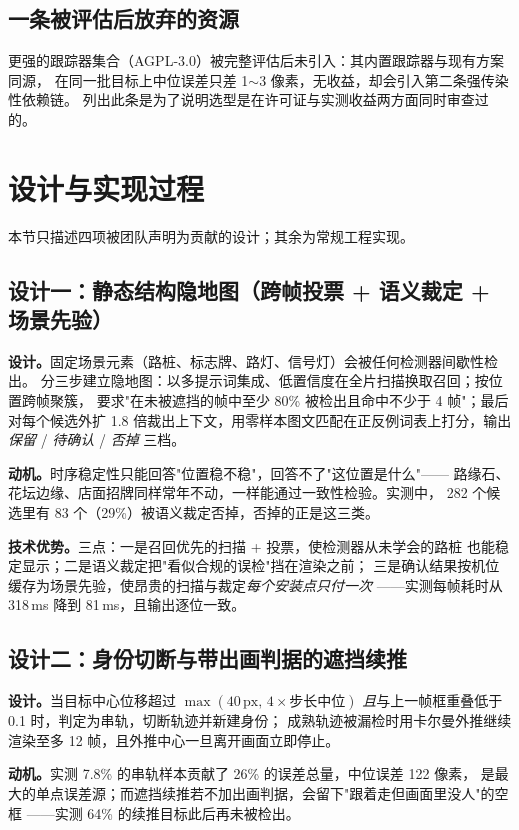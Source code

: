 \documentclass[11pt,a4paper]{ctexart}
\begin{document}
\subsection{一条被评估后放弃的资源}

更强的跟踪器集合（AGPL-3.0）被完整评估后未引入：其内置跟踪器与现有方案同源，
在同一批目标上中位误差只差 1$\sim$3 像素，无收益，却会引入第二条强传染性依赖链。
列出此条是为了说明选型是在许可证与实测收益两方面同时审查过的。

\section{设计与实现过程}

本节只描述四项被团队声明为贡献的设计；其余为常规工程实现。

\subsection{设计一：静态结构隐地图（跨帧投票 + 语义裁定 + 场景先验）}

\textbf{设计。}固定场景元素（路桩、标志牌、路灯、信号灯）会被任何检测器间歇性检出。
分三步建立隐地图：以多提示词集成、低置信度在全片扫描换取召回；按位置跨帧聚簇，
要求"在未被遮挡的帧中至少 80\% 被检出且命中不少于 4 帧"；最后对每个候选外扩
1.8 倍裁出上下文，用零样本图文匹配在正反例词表上打分，输出
\emph{保留} / \emph{待确认} / \emph{否掉} 三档。

\textbf{动机。}时序稳定性只能回答"位置稳不稳"，回答不了"这位置是什么"——
路缘石、花坛边缘、店面招牌同样常年不动，一样能通过一致性检验。实测中，
282 个候选里有 83 个（29\%）被语义裁定否掉，否掉的正是这三类。

\textbf{技术优势。}三点：一是召回优先的扫描 + 投票，使检测器从未学会的路桩
也能稳定显示；二是语义裁定把"看似合规的误检"挡在渲染之前；
三是确认结果按机位缓存为场景先验，使昂贵的扫描与裁定\emph{每个安装点只付一次}
——实测每帧耗时从 318\,ms 降到 81\,ms，且输出逐位一致。

\subsection{设计二：身份切断与带出画判据的遮挡续推}

\textbf{设计。}当目标中心位移超过 $\max(40\,\text{px},\,4\times\text{步长中位})$
\emph{且}与上一帧框重叠低于 0.1 时，判定为串轨，切断轨迹并新建身份；
成熟轨迹被漏检时用卡尔曼外推继续渲染至多 12 帧，且外推中心一旦离开画面立即停止。

\textbf{动机。}实测 7.8\% 的串轨样本贡献了 26\% 的误差总量，中位误差 122 像素，
是最大的单点误差源；而遮挡续推若不加出画判据，会留下"跟着走但画面里没人"的空框
——实测 64\% 的续推目标此后再未被检出。
\end{document}
